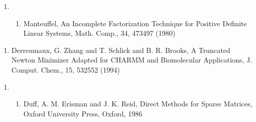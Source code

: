 \documentclass[letterpaper,11pt,english]{sphinxmanual}
\begin{document}
\begin{enumerate}
%
\setcounter{enumi}{19}
\item {} \begin{enumerate}
%
\item {} 
Manteuffel, An Incomplete Factorization Technique for Positive Definite Linear Systems, Math. Comp., 34, 473\sphinxhyphen{}497 (1980)

\end{enumerate}

\end{enumerate}
\begin{enumerate}
%
\setcounter{enumi}{15}
\item {} 
Derreumaux, G. Zhang and T. Schlick and B. R. Brooks, A Truncated Newton Minimizer Adapted for CHARMM and Biomolecular Applications, J. Comput. Chem., 15, 532\sphinxhyphen{}552 (1994)

\end{enumerate}
\begin{enumerate}
%
\item {} \begin{enumerate}
%
\setcounter{enumii}{18}
\item {} 
Duff, A. M. Erisman and J. K. Reid, Direct Methods for Sparse Matrices, Oxford University Press, Oxford, 1986

\end{enumerate}

\end{enumerate}
\end{document}
